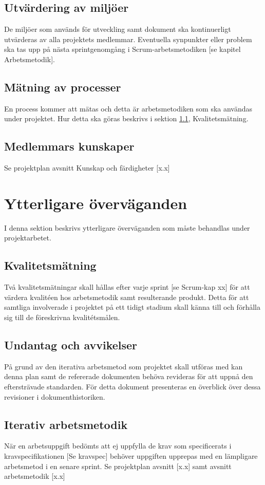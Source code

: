 \documentclass[a4paper,10pt]{article}
\begin{document}
\subsection{Utvärdering av miljöer}
De miljöer som används för utveckling samt dokument ska kontinuerligt utvärderas av alla projektets medlemmar. Eventuella synpunkter eller problem ska tas upp på nästa sprintgenomgång i Scrum-arbetsmetodiken [se kapitel Arbetsmetodik].

\subsection{Mätning av processer}
En process kommer att mätas och detta är arbetsmetodiken som ska användas under projektet. Hur detta ska göras beskrivs i sektion \ref{sec:Kvalitetsmatning}, Kvalitetsmätning.

\subsection{Medlemmars kunskaper}
Se projektplan avsnitt Kunskap och färdigheter [x.x]

\section{Ytterligare överväganden}
\vspace{5mm}
I denna sektion beskrivs ytterligare överväganden som måste behandlas under projektarbetet.
\subsection{Kvalitetsmätning}
\label{sec:Kvalitetsmatning}
Två kvalitetsmätningar skall hållas efter varje sprint [se Scrum-kap xx] för att värdera kvalitéen hos arbetsmetodik samt resulterande produkt. 
Detta för att samtliga involverade i  projektet på ett tidigt stadium skall känna till och förhålla sig till de föreskrivna kvalitétsmålen.

\subsection{Undantag och avvikelser}
På grund av den iterativa arbetsmetod som projektet skall utföras med kan denna plan samt de refererade dokumenten behöva revideras för att uppnå den eftersträvade standarden. För detta dokument presenteras en överblick över dessa revisioner i dokumenthistoriken.

\subsection{Iterativ arbetsmetodik}
När en arbetsuppgift bedömts att ej uppfylla de krav som specificerats i kravspecifikationen [Se kravspec] behöver uppgiften upprepas med en lämpligare arbetsmetod i en senare sprint. Se projektplan avsnitt [x.x] samt avsnitt arbetsmetodik [x.x]
\end{document}
